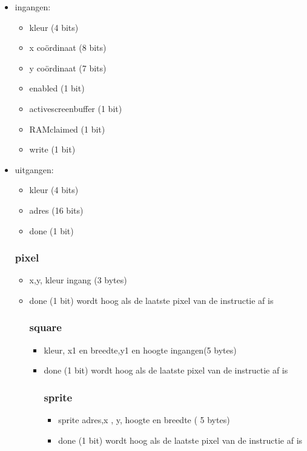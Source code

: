 \documentclass{scrartcl}
\begin{document}
\begin {itemize}
\item ingangen:
\begin {itemize}
\item kleur (4 bits)
\item x coördinaat (8 bits)
\item y coördinaat (7 bits)
\item enabled (1 bit)
\item activescreenbuffer (1 bit)
\item RAMclaimed (1 bit)
\item write (1 bit)
\end {itemize}

\item uitgangen:
\begin {itemize}
\item kleur (4 bits)
\item adres (16 bits)
\item done (1 bit)
\end {itemize}



\subsubsection { pixel}
\begin {itemize}
\item x,y, kleur ingang (3 bytes)
\item done (1 bit) wordt hoog als de laatste pixel van de instructie af is


\subsubsection { square}
\begin {itemize}
\item kleur, x1 en breedte,y1 en hoogte ingangen(5 bytes)
\item done (1 bit)  wordt hoog als de laatste pixel van de instructie af is

\subsubsection { sprite}
\begin {itemize}
\item sprite adres,x , y, hoogte en breedte ( 5 bytes)
\item done (1 bit)  wordt hoog als de laatste pixel van de instructie af is



\end{itemize}
\end{itemize}
\end{itemize}
\end{itemize}
\end{document}
